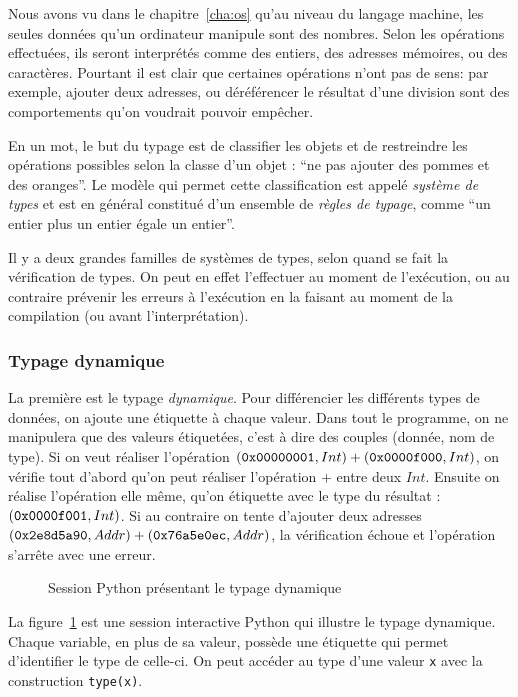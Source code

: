 Nous avons vu dans le chapitre~\ref{cha:os} qu'au niveau du langage machine, les
seules données qu'un ordinateur manipule sont des nombres. Selon les opérations
effectuées, ils seront interprétés comme des entiers, des adresses mémoires, ou
des caractères. Pourtant il est clair que certaines opérations n'ont pas de
sens: par exemple, ajouter deux adresses, ou déréférencer le résultat d'une
division sont des comportements qu'on voudrait pouvoir empêcher.

En un mot, le but du typage est de classifier les objets et de restreindre les
opérations possibles selon la classe d'un objet : ``ne pas ajouter des pommes et
des oranges''. Le modèle qui permet cette classification est appelé
\emph{système de types} et est en général constitué d'un ensemble de
\emph{règles de typage}, comme ``un entier plus un entier égale un entier''.

Il y a deux grandes familles de systèmes de types, selon quand se fait la
vérification de types. On peut en effet l'effectuer au moment de l'exécution, ou
au contraire prévenir les erreurs à l'exécution en la faisant au moment de la
compilation (ou avant l'interprétation).

\subsubsection{Typage dynamique}

La première est le typage \emph{dynamique}. Pour différencier les différents
types de données, on ajoute une étiquette à chaque valeur. Dans tout le
programme, on ne manipulera que des valeurs étiquetées, c'est à dire des couples
(donnée, nom de type). Si on veut réaliser l'opération $(\texttt{0x00000001}, Int) +
(\texttt{0x0000f000}, Int)$, on vérifie tout d'abord qu'on peut réaliser l'opération
$+$ entre deux $Int$. Ensuite on réalise l'opération elle même, qu'on étiquette
avec le type du résultat : $(\texttt{0x0000f001}, Int)$. Si au contraire on tente
d'ajouter deux adresses $(\texttt{0x2e8d5a90}, Addr) + (\texttt{0x76a5e0ec}, Addr)$, la
vérification échoue et l'opération s'arrête avec une erreur.

\begin{figure}
  \caption{Session Python présentant le typage dynamique}
  \label{fig:typage-dynamique}
\end{figure}

La figure~\ref{fig:typage-dynamique} est une session interactive Python qui
illustre le typage dynamique. Chaque variable, en plus de sa valeur, possède une
étiquette qui permet d'identifier le type de celle-ci. On peut accéder au type
d'une valeur \texttt{x} avec la construction \texttt{type(x)}.

